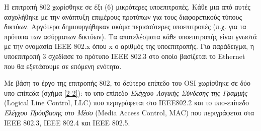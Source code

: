 Η επιτροπή 802 χωρίσθηκε σε έξι (6) μικρότερες υποεπιτροπές. Κάθε μια από αυτές ασχολήθηκε με την ανάπτυξη επιμέρους προτύπων για τους διαφορετικούς τύπους δικτύων. Αργότερα δημιουργήθηκαν ακόμα περισσότερες υποεπιτροπές (π.χ. για τα πρότυπα των ασύρματων δικτύων). Τα αποτελέσματα κάθε υποεπιτροπής είναι γνωστά με την ονομασία IEEE 802.x όπου x ο αριθμός της υποεπιτροπής. Για παράδειγμα, η υποεπιτροπή 3 σχεδίασε το πρότυπο IEEE 802.3 στο οποίο βασίζεται το Ethernet που θα εξετάσουμε σε επόμενη ενότητα.

Με βάση το έργο της επιτροπής 802, το δεύτερο επίπεδο του OSI χωρίσθηκε σε δύο υπο-επίπεδα (σχήμα \ref{2-2}): το υπο-επίπεδο \emph{Ελέγχου Λογικής Σύνδεσης της Γραμμής} (Logical Line Control, LLC) που περιγράφεται στο IEEE802.2 και το υπο-επίπεδο \emph{Ελέγχου Πρόσβασης στο Μέσο} (Media Access Control, MAC) που περιγράφεται στα IEEE 802.3, ΙΕΕΕ 802.4 και ΙΕΕΕ 802.5.

